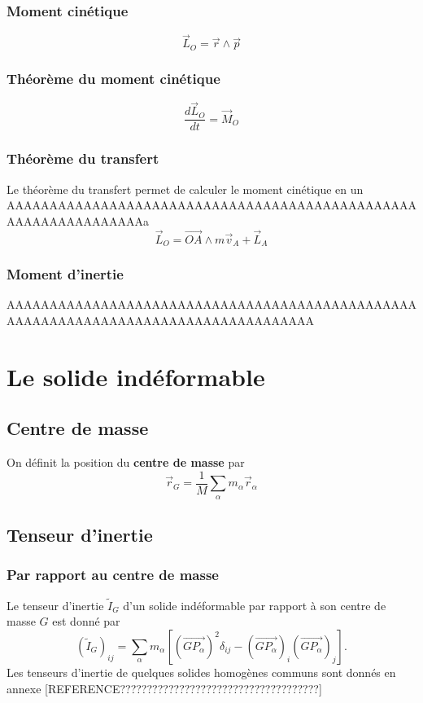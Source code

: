\documentclass{article}
\begin{document}
\subsubsection{Moment cinétique}
\begin{equation}
	\boxed{\vec L_O = \vec r \wedge \vec p}
\end{equation}

\subsubsection{Théorème du moment cinétique}
\begin{equation}
	\boxed{\frac{d \vec L_O}{dt} = \vec M_O}
\end{equation}

\subsubsection{Théorème du transfert}
Le théorème du transfert permet de calculer le moment cinétique en un AAAAAAAAAAAAAAAAAAAAAAAAAAAAAAAAAAAAAAAAAAAAAAAAAAAAAAAAAAAAAAAAa
\begin{equation}
	\vec L_O = \overrightarrow{OA} \wedge m \vec v_A + \vec L_A
\end{equation}

\subsubsection{Moment d'inertie}
AAAAAAAAAAAAAAAAAAAAAAAAAAAAAAAAAAAAAAAAAAAAAAAAAAAAAAAAAAAAAAAAAAAAAAAAAAAAAAAAAAAA

\section{Le solide indéformable}
\subsection{Centre de masse}
On définit la position du \textbf{centre de masse} par
\begin{equation}
	\vec r_G = \frac1M \sum_\alpha m_\alpha \vec r_\alpha
\end{equation}

\subsection{Tenseur d'inertie}
\subsubsection{Par rapport au centre de masse}
Le tenseur d'inertie $\tilde I_G$ d'un solide indéformable par rapport à son centre de masse $G$ est donné par
\begin{equation}
	(\tilde I_G)_{ij} = \sum_\alpha m_\alpha \left[ (\overrightarrow{GP_\alpha})^2 \delta_{ij} - (\overrightarrow{GP_\alpha})_i(\overrightarrow{GP_\alpha})_j \right].
\end{equation}
Les tenseurs d'inertie de quelques solides homogènes communs sont donnés en annexe [REFERENCE?????????????????????????????????????]
\end{document}
